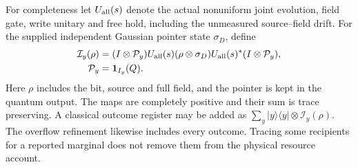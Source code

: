 For completeness let $U_{\rm all}(s)$ denote the actual nonuniform joint
evolution, field gate, write unitary and free hold, including the unmeasured
source--field drift. For the supplied independent Gaussian pointer state
$\sigma_D$, define
\begin{equation}
 \begin{aligned}
 \mathcal I_y(\rho)={}&(I\otimes\mathcal P_y)
     U_{\rm all}(s)(\rho\otimes\sigma_D)U_{\rm all}(s)^*
     (I\otimes\mathcal P_y),\\
 \mathcal P_y={}&\boldsymbol{1}_{I_y}(Q).
 \end{aligned}
 \label{eq:chvidr-retained-pointer-instrument}
\end{equation}
Here $\rho$ includes the bit, source and full field, and the pointer is
kept in the quantum output. The maps are completely positive and their
sum is trace preserving. A classical outcome register may be added as
$\sum_y|y\rangle\langle y|\otimes\mathcal I_y(\rho)$.
The overflow refinement likewise includes every outcome. Tracing some
recipients for a reported marginal does not remove them from the physical
resource account.

